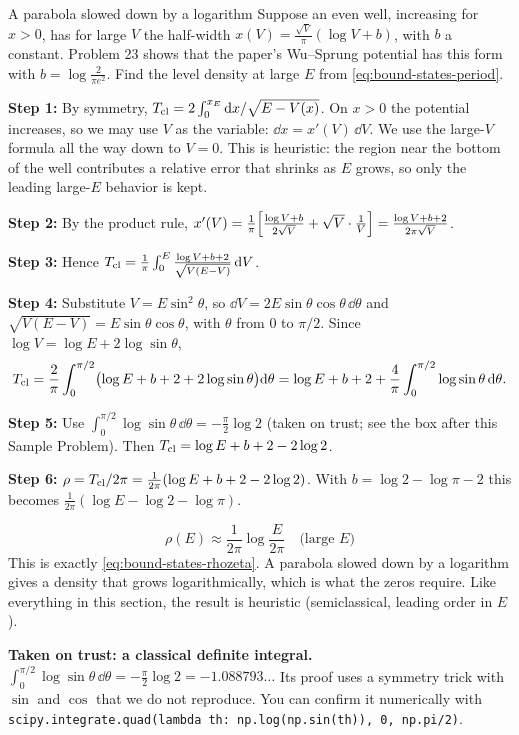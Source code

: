 \begin{sample}{A parabola slowed down by a logarithm}
Suppose an even well, increasing for $x>0$, has for large $V$ the half-width $x(V)=\frac{\sqrt V}{\pi}(\log V+b)$, with $b$ a constant. Problem 23 shows that the paper's Wu--Sprung potential has this form with $b=\log\frac{2}{\pi e^2}$. Find the level density at large $E$ from \cref{eq:bound-states-period}.

\textbf{Step 1:} By symmetry, $T_{\rm cl}=2\int_0^{x_E}\mathrm{d} x/\sqrt{E-V(x)}$. On $x>0$ the potential increases, so we may use $V$ as the variable: $\dd x=x'(V)\,\dd V$. We use the large-$V$ formula all the way down to $V=0$. This is heuristic: the region near the bottom of the well contributes a relative error that shrinks as $E$ grows, so only the leading large-$E$ behavior is kept.

\textbf{Step 2:} By the product rule, $x'(V)=\frac1\pi\Bigl[\frac{\log V+b}{2\sqrt V}+\sqrt V\cdot\frac1V\Bigr]=\frac{\log V+b+2}{2\pi\sqrt V}$.

\textbf{Step 3:} Hence $T_{\rm cl}=\frac1\pi\int_0^E\frac{\log V+b+2}{\sqrt{V(E-V)}}\,\mathrm{d} V$.

\textbf{Step 4:} Substitute $V=E\sin^2\theta$, so $\dd V=2E\sin\theta\cos\theta\,\dd\theta$ and $\sqrt{V(E-V)}=E\sin\theta\cos\theta$, with $\theta$ from $0$ to $\pi/2$. Since $\log V=\log E+2\log\sin\theta$,
\[
T_{\rm cl}=\frac2\pi\int_0^{\pi/2}\bigl(\log E+b+2+2\log\sin\theta\bigr)\mathrm{d}\theta=\log E+b+2+\frac4\pi\int_0^{\pi/2}\log\sin\theta\,\mathrm{d}\theta .
\]

\textbf{Step 5:} Use $\int_0^{\pi/2}\log\sin\theta\,\dd\theta=-\frac\pi2\log2$ (taken on trust; see the box after this Sample Problem). Then $T_{\rm cl}=\log E+b+2-2\log2$.

\textbf{Step 6:} $\rho=T_{\rm cl}/2\pi=\frac{1}{2\pi}(\log E+b+2-2\log2)$. With $b=\log2-\log\pi-2$ this becomes $\frac{1}{2\pi}(\log E-\log2-\log\pi)$.

\[
\boxed{\rho(E)\approx\frac{1}{2\pi}\log\frac{E}{2\pi}\quad\text{(large }E\text{)}}
\]
This is exactly \cref{eq:bound-states-rhozeta}. A parabola slowed down by a logarithm gives a density that grows logarithmically, which is what the zeros require. Like everything in this section, the result is heuristic (semiclassical, leading order in $E$).
\end{sample}

\begin{beyond}
\textbf{Taken on trust: a classical definite integral.} $\displaystyle\int_0^{\pi/2}\log\sin\theta\,\dd\theta=-\frac{\pi}{2}\log2=-1.088793\ldots$ Its proof uses a symmetry trick with $\sin$ and $\cos$ that we do not reproduce. You can confirm it numerically with \texttt{scipy.integrate.quad(lambda th: np.log(np.sin(th)), 0, np.pi/2)}.
\end{beyond}

